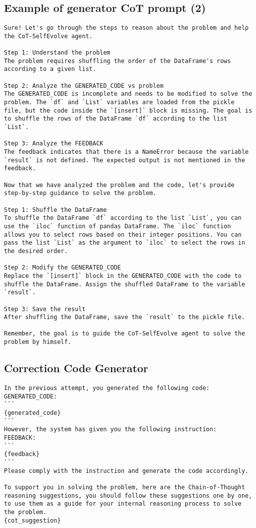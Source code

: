 \subsection{Example of generator CoT prompt (2)}
\begin{verbatim}
Sure! Let's go through the steps to reason about the problem and help the CoT-SelfEvolve agent.

Step 1: Understand the problem
The problem requires shuffling the order of the DataFrame's rows according to a given list.

Step 2: Analyze the GENERATED_CODE vs problem
The GENERATED_CODE is incomplete and needs to be modified to solve the problem. The `df` and `List` variables are loaded from the pickle file, but the code inside the `[insert]` block is missing. The goal is to shuffle the rows of the DataFrame `df` according to the list `List`.

Step 3: Analyze the FEEDBACK
The feedback indicates that there is a NameError because the variable `result` is not defined. The expected output is not mentioned in the feedback.

Now that we have analyzed the problem and the code, let's provide step-by-step guidance to solve the problem.

Step 1: Shuffle the DataFrame
To shuffle the DataFrame `df` according to the list `List`, you can use the `iloc` function of pandas DataFrame. The `iloc` function allows you to select rows based on their integer positions. You can pass the list `List` as the argument to `iloc` to select the rows in the desired order.

Step 2: Modify the GENERATED_CODE
Replace the `[insert]` block in the GENERATED_CODE with the code to shuffle the DataFrame. Assign the shuffled DataFrame to the variable `result`.

Step 3: Save the result
After shuffling the DataFrame, save the `result` to the pickle file.

Remember, the goal is to guide the CoT-SelfEvolve agent to solve the problem by himself.
\end{verbatim}

\subsection{Correction Code Generator}
\label{sec:correction_code_generator}
\begin{verbatim}
In the previous attempt, you generated the following code:
GENERATED_CODE:
```
{generated_code}
```
However, the system has given you the following instruction:
FEEDBACK:
```
{feedback}
```
Please comply with the instruction and generate the code accordingly.

To support you in solving the problem, here are the Chain-of-Thought reasoning suggestions, you should follow these suggestions one by one, to use them as a guide for your internal reasoning process to solve the problem.
{cot_suggestion}
\end{verbatim}
